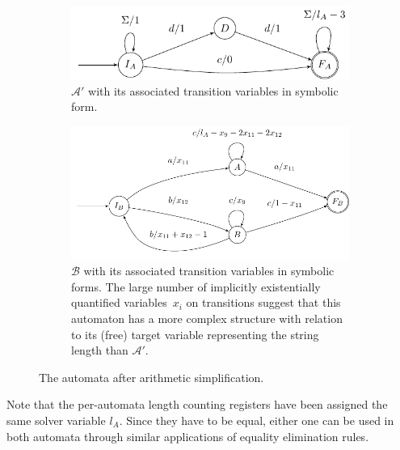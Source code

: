 \begin{figure}[ht]
    \centering 
  \begin{subfigure}{0.42\textwidth}
    \centering
    \includegraphics[width=\textwidth]{a_annotated}
    \vspace*{5ex}
    \caption{ $\mathcal{A}'$ with its associated transition variables in symbolic
    form.}\label{fig:aut_a_annotated}
    \vspace*{1.9ex}
  \end{subfigure}\hfill%
  \begin{subfigure}{0.54\textwidth}
    \centering
    \includegraphics[width=\textwidth]{b_annotated}
    \caption{$\mathcal{B}$ with its associated transition variables in symbolic forms.
    The large number of implicitly existentially quantified
    variables~$x_i$ on
    transitions suggest that this automaton has a more complex structure
    with relation to its (free) target variable representing the string length
    than $\mathcal{A}'$. %
  }\label{fig:aut_b_annotated}
  \end{subfigure}
  \caption{The automata after arithmetic simplification.}\label{fig:propagated}
\end{figure}


Note that the per-automata length counting registers have been assigned the same
solver variable $l_A$. Since they have to be equal, either one can be used in
both automata through similar applications of equality elimination rules.

